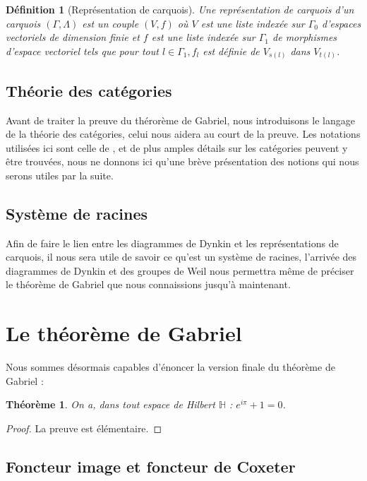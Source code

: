\documentclass[a4paper,10pt]{article}
\newtheorem{thm}{Théorème}[section]
\newtheorem{defi}{Définition}[section]
\begin{document}
\begin{defi}[Représentation de carquois]
  Une représentation de carquois d'un carquois $(\Gamma,\Lambda)$ est un couple $(V,f)$ où $V$ est une liste indexée sur $\Gamma_0$ d'espaces vectoriels de dimension finie et $f$ est une liste indexée sur $\Gamma_1$ de morphismes d'espace vectoriel tels que pour tout $l \in \Gamma_1, f_l$ est définie de $V_{s(l)}$ dans $V_{t(l)}$.

\end{defi}

\subsection{Théorie des catégories}
Avant de traiter la preuve du thérorème de Gabriel, nous introduisons le langage de la théorie des catégories, celui nous aidera au court de la preuve. Les notations utilisées ici sont celle de \cite{A97}, et de plus amples détails sur les catégories peuvent y être trouvées, nous ne donnons ici qu'une brève présentation des notions qui nous serons utiles par la suite.

\subsection{Système de racines}
Afin de faire le lien entre les diagrammes de Dynkin et les représentations de carquois, il nous sera utile de savoir ce qu'est un système de racines, l'arrivée des diagrammes de Dynkin et des groupes de Weil nous permettra même de préciser le théorème de Gabriel que nous connaissions jusqu'à maintenant.



\clearpage
\section{Le théorème de Gabriel}
Nous sommes désormais capables d'énoncer la version finale du théorème de Gabriel :
	\begin{thm}
		On a, dans tout espace de Hilbert $\mathbb{H}$ : $e^{i\pi}+1=0$.
	\end{thm}
	\begin{proof}
		La preuve est élémentaire.
	\end{proof}	

\subsection{Foncteur image et foncteur de Coxeter}
\end{document}
